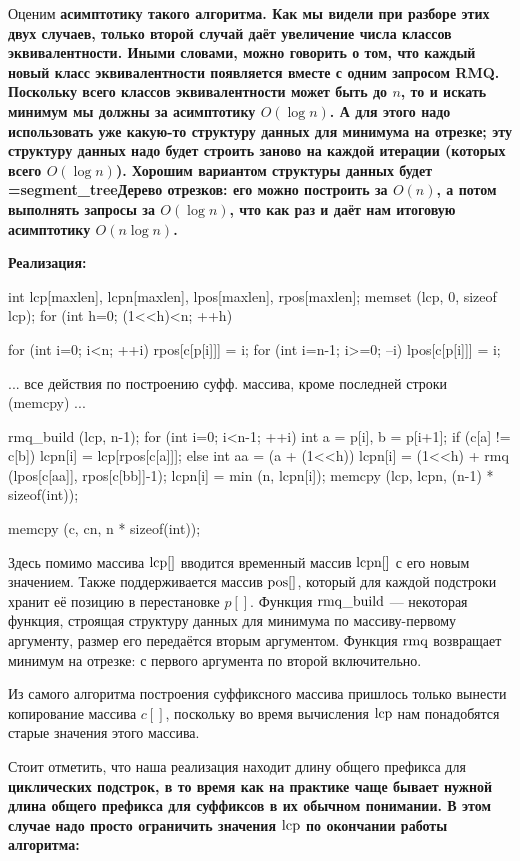 Оценим \bf{асимптотику} такого алгоритма. Как мы видели при разборе этих двух случаев, только второй случай даёт увеличение числа классов эквивалентности. Иными словами, можно говорить о том, что каждый новый класс эквивалентности появляется вместе с одним запросом RMQ. Поскольку всего классов эквивалентности может быть до $n$, то и искать минимум мы должны за асимптотику $O(\log n)$. А для этого надо использовать уже какую-то структуру данных для минимума на отрезке; эту структуру данных надо будет строить заново на каждой итерации (которых всего $O(\log n)$). Хорошим вариантом структуры данных будет \bf{\algohref=segment_tree{Дерево отрезков}}: его можно построить за $O(n)$, а потом выполнять запросы за $O(\log n)$, что как раз и даёт нам итоговую асимптотику $O(n \log n)$.

\bf{Реализация:}

\code
int lcp[maxlen], lcpn[maxlen], lpos[maxlen], rpos[maxlen];
memset (lcp, 0, sizeof lcp);
for (int h=0; (1<<h)<n; ++h) {
	for (int i=0; i<n; ++i)
		rpos[c[p[i]]] = i;
	for (int i=n-1; i>=0; --i)
		lpos[c[p[i]]] = i;

	... все действия по построению суфф. массива, кроме последней строки (memcpy) ...

	rmq_build (lcp, n-1);
	for (int i=0; i<n-1; ++i) {
		int a = p[i],  b = p[i+1];
		if (c[a] != c[b])
			lcpn[i] = lcp[rpos[c[a]]];
		else {
			int aa = (a + (1<<h)) %
			lcpn[i] = (1<<h) + rmq (lpos[c[aa]], rpos[c[bb]]-1);
			lcpn[i] = min (n, lcpn[i]);
		}
	}
	memcpy (lcp, lcpn, (n-1) * sizeof(int));

	memcpy (c, cn, n * sizeof(int));
}
\endcode

Здесь помимо массива $\rm lcp[]$ вводится временный массив $\rm lcpn[]$ с его новым значением. Также поддерживается массив $\rm pos[]$, который для каждой подстроки хранит её позицию в перестановке $p[]$. Функция $\rm rmq\_build$ --- некоторая функция, строящая структуру данных для минимума по массиву-первому аргументу, размер его передаётся вторым аргументом. Функция $\rm rmq$ возвращает минимум на отрезке: с первого аргумента по второй включительно.

Из самого алгоритма построения суффиксного массива пришлось только вынести копирование массива $c[]$, поскольку во время вычисления $\rm lcp$ нам понадобятся старые значения этого массива.

Стоит отметить, что наша реализация находит длину общего префикса для \bf{циклических подстрок}, в то время как на практике чаще бывает нужной длина общего префикса для суффиксов в их обычном понимании. В этом случае надо просто ограничить значения $\rm lcp$ по окончании работы алгоритма:

